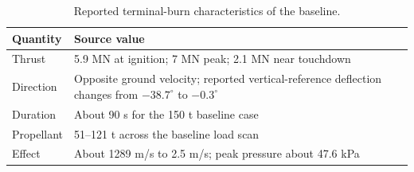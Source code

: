 \begin{table}[htbp]
\caption{Reported terminal-burn characteristics of the baseline.}
\label{tab:src8}
\small
\setlength{\tabcolsep}{3.5pt}
\begin{tabularx}{\linewidth}{@{}p{.22\linewidth}X@{}}
\toprule
Quantity & Source value \\
\midrule
Thrust & 5.9 MN at ignition; 7 MN peak; 2.1 MN near touchdown \\
Direction & Opposite ground velocity; reported vertical-reference deflection changes from $-38.7^\circ$ to $-0.3^\circ$ \\
Duration & About 90 s for the 150 t baseline case \\
Propellant & 51--121 t across the baseline load scan \\
Effect & About 1289 m/s to 2.5 m/s; peak pressure about 47.6 kPa \\
\bottomrule
\end{tabularx}
\end{table}

